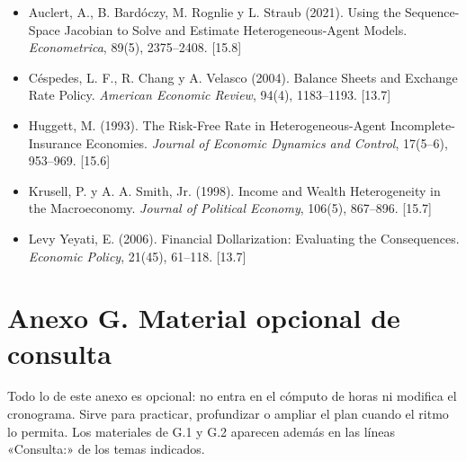 \documentclass[11pt,a4paper]{article}
\begin{document}
\medskip
{\small
\begin{itemize}[leftmargin=1.4em,itemsep=1pt,label={}]
\item Auclert, A., B. Bardóczy, M. Rognlie y L. Straub (2021). Using the Sequence-Space Jacobian to Solve and Estimate Heterogeneous-Agent Models. \emph{Econometrica}, 89(5), 2375--2408. [15.8]
\item Céspedes, L. F., R. Chang y A. Velasco (2004). Balance Sheets and Exchange Rate Policy. \emph{American Economic Review}, 94(4), 1183--1193. [13.7]
\item Huggett, M. (1993). The Risk-Free Rate in Heterogeneous-Agent Incomplete-Insurance Economies. \emph{Journal of Economic Dynamics and Control}, 17(5--6), 953--969. [15.6]
\item Krusell, P. y A. A. Smith, Jr. (1998). Income and Wealth Heterogeneity in the Macroeconomy. \emph{Journal of Political Economy}, 106(5), 867--896. [15.7]
\item Levy Yeyati, E. (2006). Financial Dollarization: Evaluating the Consequences. \emph{Economic Policy}, 21(45), 61--118. [13.7]
\end{itemize}
}

\newpage
\section*{Anexo G. Material opcional de consulta}

Todo lo de este anexo es opcional: no entra en el cómputo de horas ni modifica el
cronograma. Sirve para practicar, profundizar o ampliar el plan cuando el ritmo lo
permita. Los materiales de G.1 y G.2 aparecen además en las líneas
«Consulta:» de los temas indicados.
\end{document}
